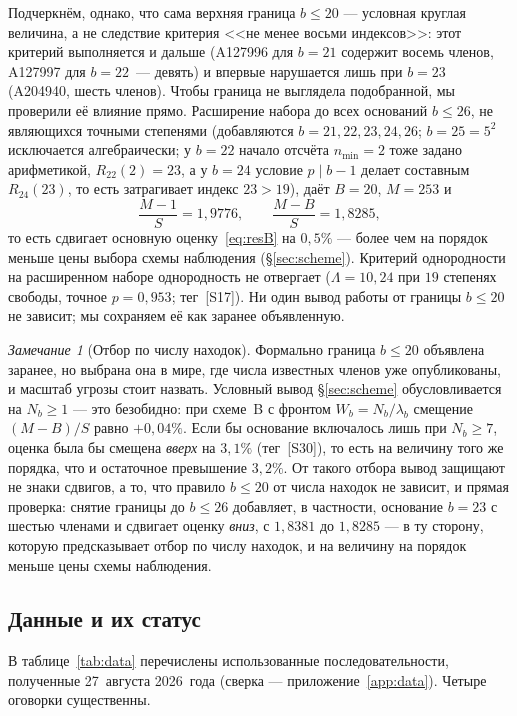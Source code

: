 \documentclass[11pt,a4paper]{article}
\theoremstyle{plain}
\theoremstyle{remark}
\newtheorem{remark}{Замечание}
\begin{document}
Подчеркнём, однако, что сама верхняя граница $b\le20$ --- условная круглая величина,
а не следствие критерия <<не менее восьми индексов>>: этот критерий выполняется и
дальше (A127996 для $b=21$ содержит восемь членов, A127997 для $b=22$~--- девять) и
впервые нарушается лишь при $b=23$ (A204940, шесть членов). Чтобы граница не выглядела
подобранной, мы проверили её влияние прямо. Расширение набора до всех оснований
$b\le26$, не являющихся точными степенями (добавляются $b=21,22,23,24,26$; $b=25=5^2$
исключается алгебраически; у $b=22$ начало отсчёта $n_{\min}=2$ тоже задано
арифметикой, $R_{22}(2)=23$, а у $b=24$ условие $p\mid b-1$ делает составным
$R_{24}(23)$, то есть затрагивает индекс $23>19$), даёт $B=20$, $M=253$ и
\[
  \frac{M-1}{S}=1{,}9776,\qquad \frac{M-B}{S}=1{,}8285,
\]
то есть сдвигает основную оценку~\eqref{eq:resB} на $0{,}5\%$ --- более чем на
порядок меньше цены выбора схемы наблюдения (\S\ref{sec:scheme}). Критерий однородности
на расширенном наборе однородность не отвергает
($\Lambda=10{,}24$ при $19$ степенях свободы, точное $p=0{,}953$; тег~[S17]).
Ни один вывод работы от границы $b\le20$ не зависит; мы сохраняем её как заранее
объявленную.

\begin{remark}[Отбор по числу находок]\label{rem:selection}
Формально граница $b\le20$ объявлена заранее, но выбрана она в мире, где числа
известных членов уже опубликованы, и масштаб угрозы стоит назвать. Условный вывод
\S\ref{sec:scheme} обусловливается на $N_b\ge1$ --- это безобидно: при схеме~B с
фронтом $W_b=N_b/\lambda_b$ смещение $(M-B)/S$ равно $+0{,}04\%$. Если бы основание
включалось лишь при $N_b\ge7$, оценка была бы смещена \emph{вверх} на $3{,}1\%$
(тег~[S30]), то есть на величину того же порядка, что и остаточное превышение
$3{,}2\%$. От такого отбора вывод защищают не знаки сдвигов, а то, что правило
$b\le20$ от числа находок не зависит, и прямая проверка: снятие границы до $b\le26$
добавляет, в частности, основание $b=23$ с шестью членами и сдвигает оценку
\emph{вниз}, с $1{,}8381$ до $1{,}8285$ --- в ту сторону, которую предсказывает
отбор по числу находок, и на величину на порядок меньше цены схемы наблюдения.
\end{remark}

\subsection{Данные и их статус}
В таблице~\ref{tab:data} перечислены использованные последовательности,
полученные 27~августа 2026~года (сверка --- приложение~\ref{app:data}).
Четыре оговорки существенны.
\end{document}
